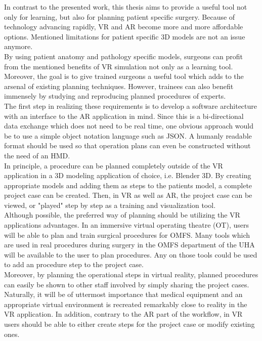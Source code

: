 In contrast to the presented work, this thesis aims to provide a useful tool not only for learning, but also for planning patient specific surgery.
Because of technology advancing rapidly, VR and AR become more and more affordable options.
Mentioned limitations for patient specific 3D models are not an issue anymore.
\\ By using patient anatomy and pathology specific models, surgeons can profit from the mentioned benefits of VR simulation not only as a learning tool.
Moreover, the goal is to give trained surgeons a useful tool which adds to the arsenal of existing planning techniques.
However, trainees can also benefit immensely by studying and reproducing planned procedures of experts.
\\ The first step in realizing these requirements is to develop a software architecture with an interface to the AR application in mind.
Since this is a bi-directional data exchange which does not need to be real time, one obvious approach would be to use a simple object notation language such as JSON.
A humanly readable format should be used so that operation plans can even be constructed without the need of an HMD.
\\ In principle, a procedure can be planned completely outside of the VR application in a 3D modeling application of choice, i.e. Blender 3D.
By creating appropriate models and adding them as steps to the patients model, a complete project case can be created.
Then, in VR as well as AR, the project case can be viewed, or "played" step by step as a training and visualization tool.
\\ Although possible, the preferred way of planning should be utilizing the VR applications advantages.
In an immersive virtual operating theatre (OT), users will be able to plan and train surgical procedures for OMFS.
Many tools which are used in real procedures during surgery in the OMFS department of the UHA will be available to the user to plan procedures.
Any on those tools could be used to add an procedure step to the project case.
\\ Moreover, by planning the operational steps in virtual reality, planned procedures can easily be shown to other staff involved by simply sharing the project cases.
Naturally, it will be of uttermost importance that medical equipment and an appropriate virtual environment is recreated remarkably close to reality in the VR application.
In addition, contrary to the AR part of the workflow, in VR users should be able to either create steps for the project case or modify existing ones.